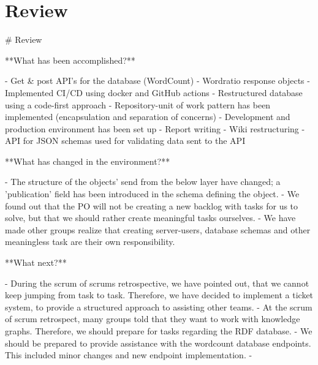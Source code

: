 \section{Review}



# Review

**What has been accomplished?**

- Get & post API's for the database (WordCount)
- Wordratio response objects
- Implemented CI/CD using docker and GitHub actions
- Restructured database using a code-first approach
- Repository-unit of work pattern has been implemented (encapsulation and separation of concerns)
- Development and production environment has been set up
- Report writing
- Wiki restructuring
- API for JSON schemas used for validating data sent to the API

**What has changed in the environment?**

- The structure of the objects' send from the below layer have changed; a 'publication' field has been introduced in the schema defining the object.
- We found out that the PO will not be creating a new backlog with tasks for us to solve, but that we should rather create meaningful tasks ourselves.
- We have made other groups realize that creating server-users, database schemas and other meaningless task are their own responsibility.

**What next?**

- During the scrum of scrums retrospective, we have pointed out, that we cannot keep jumping from task to task. Therefore, we have decided to implement a ticket system, to provide a structured approach to assisting other teams.
- At the scrum of scrum retrospect, many groups told that they want to work with knowledge graphs. Therefore, we should prepare for tasks regarding the RDF database.
- We should be prepared to provide assistance with the wordcount database endpoints. This included minor changes and new endpoint implementation.
-